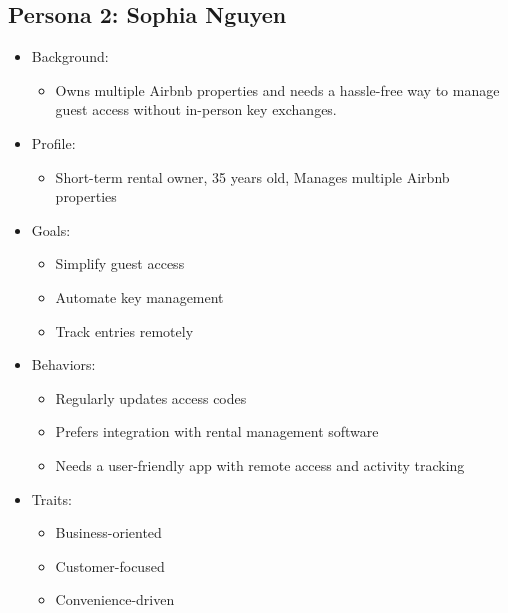 \subsection*{Persona 2: Sophia Nguyen}
\begin{itemize}
    \item Background:
    \begin{itemize}
        \item Owns multiple Airbnb properties and needs a hassle-free way to manage guest access without in-person key exchanges.
    \end{itemize}

    \item Profile:
    \begin{itemize}
        \item Short-term rental owner, 35 years old, Manages multiple Airbnb properties
    \end{itemize}

    \item Goals:
    \begin{itemize}
        \item Simplify guest access
        \item Automate key management
        \item Track entries remotely
    \end{itemize}

    \item Behaviors:
    \begin{itemize}
        \item Regularly updates access codes
        \item Prefers integration with rental management software
        \item Needs a user-friendly app with remote access and activity tracking
    \end{itemize}

    \item Traits:
    \begin{itemize}
        \item Business-oriented
        \item Customer-focused
        \item Convenience-driven
    \end{itemize}
\end{itemize}
